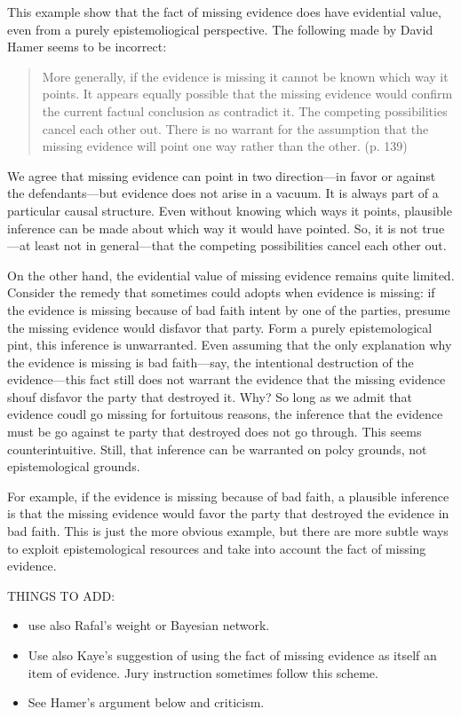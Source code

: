 \documentclass[
  10pt,
  dvipsnames,enabledeprecatedfontcommands]{scrartcl}
\begin{document}
This example show that the fact of missing evidence does have evidential
value, even from a purely epistemoliogical perspective. The following
made by David Hamer seems to be incorrect:

\begin{quote}
More generally, if the evidence is missing it cannot be known which way it points.
It appears equally possible that the missing evidence would confirm the current factual conclusion as contradict it. The competing possibilities cancel each other out. There is no warrant for the assumption that the missing evidence will point one way rather than the other. (p. 139)
\end{quote}

\noindent We agree that missing evidence can point in two direction---in
favor or against the defendants---but evidence does not arise in a
vacuum. It is always part of a particular causal structure. Even without
knowing which ways it points, plausible inference can be made about
which way it would have pointed. So, it is not true---at least not in
general---that the competing possibilities cancel each other out.

On the other hand, the evidential value of missing evidence remains
quite limited. Consider the remedy that sometimes could adopts when
evidence is missing: if the evidence is missing because of bad faith
intent by one of the parties, presume the missing evidence would
disfavor that party. Form a purely epistemological pint, this inference
is unwarranted. Even assuming that the only explanation why the evidence
is missing is bad faith---say, the intentional destruction of the
evidence---this fact still does not warrant the evidence that the
missing evidence shouf disfavor the party that destroyed it. Why? So
long as we admit that evidence coudl go missing for fortuitous reasons,
the inference that the evidence must be go against te party that
destroyed does not go through. This seems counterintuitive. Still, that
inference can be warranted on polcy grounds, not epistemological
grounds.

For example, if the evidence is missing because of bad faith, a
plausible inference is that the missing evidence would favor the party
that destroyed the evidence in bad faith. This is just the more obvious
example, but there are more subtle ways to exploit epistemological
resources and take into account the fact of missing evidence.

THINGS TO ADD:

\begin{itemize}
\item
  use also Rafal's weight or Bayesian network.
\item
  Use also Kaye's suggestion of using the fact of missing evidence as
  itself an item of evidence. Jury instruction sometimes follow this
  scheme.
\item
  See Hamer's argument below and criticism.
\end{itemize}
\end{document}
